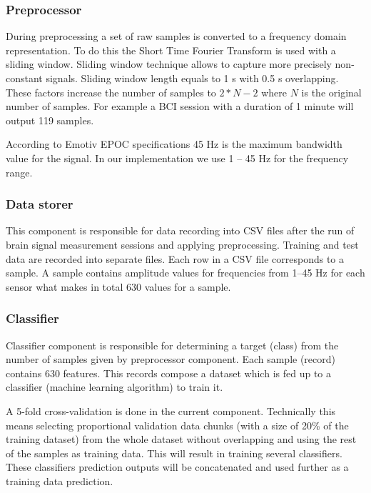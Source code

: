 \documentclass[12pt]{article}
\theoremstyle{definition}
\begin{document}
\subsubsection{Preprocessor}

During preprocessing a set of raw samples is converted to a frequency domain representation. To do this the Short Time Fourier Transform is used with a sliding window. Sliding window technique allows to capture more precisely non-constant signals. Sliding window length equals to 1 s with 0.5 s overlapping. These factors increase the number of samples to $2*N-2$ where $N$ is the original number of samples. For example a BCI session with a duration of 1 minute will output 119 samples.

According to Emotiv EPOC specifications \cite{emotiv} 45 Hz is the maximum bandwidth value for the signal. In our implementation we use 1 -- 45 Hz for the frequency range.

\subsubsection{Data storer}

This component is responsible for data recording into CSV files after the run of brain signal measurement sessions and applying preprocessing. Training and test data are recorded into separate files. Each row in a CSV file corresponds to a sample. A sample contains amplitude values for frequencies from 1--45 Hz for each sensor what makes in total 630 values for a sample. 

\subsubsection{Classifier}

Classifier component is responsible for determining a target (class) from the number of samples given by preprocessor component. Each sample (record) contains 630 features. This records compose a dataset which is fed up to a classifier (machine learning algorithm) to train it. 

A 5-fold cross-validation is done in the current component. Technically this means selecting proportional validation data chunks (with a size of 20\% of the training dataset) from the whole dataset without overlapping and using the rest of the samples as training data. This will result in training several classifiers. These classifiers prediction outputs will be concatenated and used further as a training data prediction.
\end{document}
